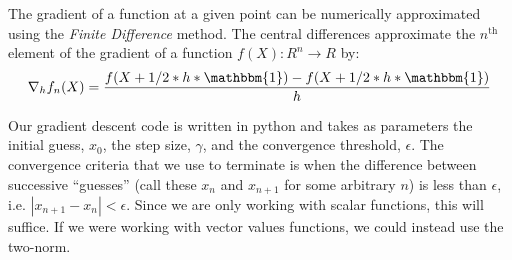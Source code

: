\documentclass{article}
\begin{document}
\begin{table}[hb]
\caption{Number of iterations for convergence and final value of the objective function for different values of the step, threshold and initial guess.}
\label{GradInitialCond}
\begin{center}
\begin{small}
\begin{sc}
\end{sc}
\end{small}
\end{center}
\vskip -0.1in
\end{table}

The gradient of a function at a given point can be numerically approximated using the \textit{Finite Difference} method. The central differences approximate the $n^{\text {th}}$ element of the gradient of a function $f(X):R^n\rightarrow R$ by:
\small
\begin{equation}
\nabla_h f_n(X)=\frac{f(X+1/2*h*\mathbbm{1})-f(X+1/2*h*\mathbbm{1})}{h}
\end{equation}
\normalsize

Our gradient descent code is written in python and takes as parameters the initial guess, $x_0$, the step size, $\gamma$, and the convergence threshold, $\epsilon$.  The convergence criteria that we use to terminate is when the difference between successive ``guesses'' (call these $x_n$ and $x_{n+1}$ for some arbitrary $n$) is less than $\epsilon$, i.e. $|x_{n+1} -x_n | < \epsilon$.  Since we are only working with scalar functions, this will suffice.  If we were working with vector values functions, we could instead use the two-norm.  
\end{document}
